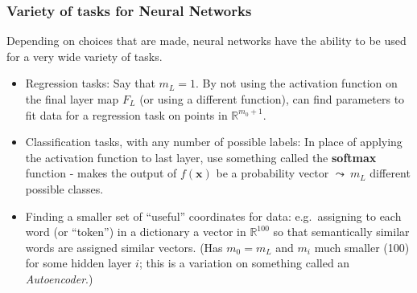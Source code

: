 \documentclass[smaller]{beamer}
\theoremstyle{example}
\newcommand{\x}{\textbf{x}}
\begin{document}
\begin{frame}
    \frametitle{Variety of tasks for Neural Networks}
    Depending on choices that are made, neural networks have the ability to be used for a very wide variety of tasks. 

    \pause
    \begin{itemize}
        \item Regression tasks: Say that $m_L = 1$. By not using the activation function on the final layer map $F_L$ (or using a different function), can find parameters to fit data for a regression task on points in $\mathbb R^{m_0+1}$.
        \pause
        \item Classification tasks, with any number of possible labels: In place of applying the activation function to last layer, use something called the \textbf{softmax} function - makes the output of $f(\x)$ be a probability vector $\leadsto\ m_L$ different possible classes. 
        \pause
        \item Finding a smaller set of ``useful'' coordinates for data: e.g.\ assigning to each word (or ``token'') in a dictionary a vector in $\mathbb R^{100}$ so that semantically similar words are assigned similar vectors. (Has $m_0=m_L$ and $m_i$ much smaller (100) for some hidden layer $i$; this is a variation on something called an \textit{Autoencoder}.)
    \end{itemize}
\end{frame}
\end{document}
